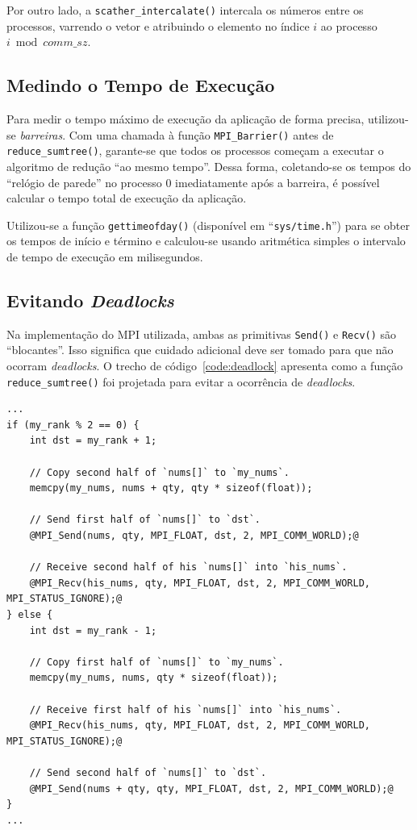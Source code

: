 \documentclass[12pt,a4paper]{article}
\begin{document}
Por outro lado, a \texttt{scather\_intercalate()} intercala os números entre os
processos, varrendo o vetor e atribuindo o elemento no índice $i$ ao processo $i
\bmod comm\_sz$. 


\subsection{Medindo o Tempo de Execução}
Para medir o tempo máximo de execução da aplicação de forma precisa, utilizou-se
\emph{barreiras}. Com uma chamada à função \texttt{MPI\_Barrier()} antes de
\texttt{reduce\_sumtree()}, garante-se que todos os processos começam a executar
o algoritmo de redução ``ao mesmo tempo''. Dessa forma, coletando-se os tempos
do ``relógio de parede'' no processo 0 imediatamente após a barreira, é possível
calcular o tempo total de execução da aplicação.

Utilizou-se a função \texttt{gettimeofday()} (disponível em
``\texttt{sys/time.h}'') para se obter os tempos de início e término e
calculou-se usando aritmética simples o intervalo de tempo de execução em
milisegundos.


\subsection{Evitando \textit{Deadlocks}}
\label{sec:avoiding-deadlocks}
Na implementação do MPI utilizada, ambas as primitivas \texttt{Send()} e
\texttt{Recv()} são ``blocantes''. Isso significa que cuidado adicional deve ser
tomado para que não ocorram \textit{deadlocks}. O trecho de
código~\ref{code:deadlock} apresenta como a função \texttt{reduce\_sumtree()}
foi projetada para evitar a ocorrência de \textit{deadlocks}.

\begin{minipage}{\linewidth}
\begin{lstlisting}[frame=single, style=c, label={code:deadlock},
    caption={Ordem das primitivas MPI\_Send() e MPI\_Recv() na função \texttt{reduce\_sumtree()}.}]
...
if (my_rank % 2 == 0) {
    int dst = my_rank + 1;

    // Copy second half of `nums[]` to `my_nums`.
    memcpy(my_nums, nums + qty, qty * sizeof(float));

    // Send first half of `nums[]` to `dst`.
    @MPI_Send(nums, qty, MPI_FLOAT, dst, 2, MPI_COMM_WORLD);@

    // Receive second half of his `nums[]` into `his_nums`.
    @MPI_Recv(his_nums, qty, MPI_FLOAT, dst, 2, MPI_COMM_WORLD, MPI_STATUS_IGNORE);@
} else {
    int dst = my_rank - 1;

    // Copy first half of `nums[]` to `my_nums`.
    memcpy(my_nums, nums, qty * sizeof(float));

    // Receive first half of his `nums[]` into `his_nums`.
    @MPI_Recv(his_nums, qty, MPI_FLOAT, dst, 2, MPI_COMM_WORLD, MPI_STATUS_IGNORE);@

    // Send second half of `nums[]` to `dst`.
    @MPI_Send(nums + qty, qty, MPI_FLOAT, dst, 2, MPI_COMM_WORLD);@
}
...
\end{lstlisting}
\end{minipage}
\end{document}

